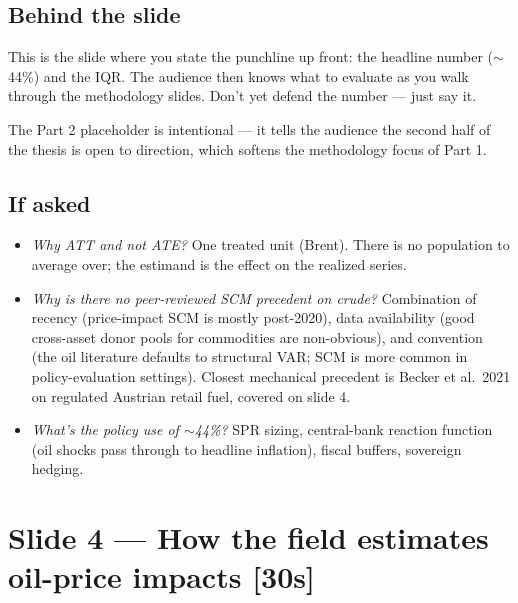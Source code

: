 \documentclass[11pt,a4paper]{article}
\newcommand{\timetag}[1]{\hfill\textcolor{muted}{\small[#1]}}
\begin{document}
\subsection{Behind the slide}
This is the slide where you state the punchline up front: the headline number ($\sim$44\%) and the IQR. The audience then knows what to evaluate as you walk through the methodology slides. Don't yet defend the number --- just say it.

The Part 2 placeholder is intentional --- it tells the audience the second half of the thesis is open to direction, which softens the methodology focus of Part 1.

\subsection{If asked}
\begin{itemize}
  \item \textit{Why ATT and not ATE?} One treated unit (Brent). There is no population to average over; the estimand is the effect on the realized series.
  \item \textit{Why is there no peer-reviewed SCM precedent on crude?} Combination of recency (price-impact SCM is mostly post-2020), data availability (good cross-asset donor pools for commodities are non-obvious), and convention (the oil literature defaults to structural VAR; SCM is more common in policy-evaluation settings). Closest mechanical precedent is Becker et al.\ 2021 on regulated Austrian retail fuel, covered on slide 4.
  \item \textit{What's the policy use of $\sim$44\%?} SPR sizing, central-bank reaction function (oil shocks pass through to headline inflation), fiscal buffers, sovereign hedging.
\end{itemize}

\section{Slide 4 --- How the field estimates oil-price impacts \timetag{30s}}
\end{document}
